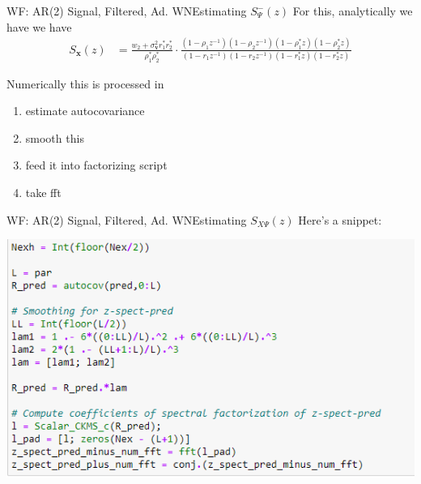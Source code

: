 \documentclass{beamer}  %
\begin{document}
\begin{frame}{WF: AR(2) Signal, Filtered, Ad. WN}{Estimating $S^-_{\Psi}(z)$}
	For this, analytically we have we have 
	\begin{align*}
	S_{\textbf{x}}(z) &=\frac{w_2 + \sigma_{\textbf{v}}^2r^*_1r^*_2}{\rho_1^*\rho_2^*}\cdot \frac{(1 - \rho_1z^{-1})(1 - \rho_2z^{-1})(1 - \rho_1^*z)(1 - \rho_2^*z)}{(1 - r_1z^{-1})(1 - r_2z^{-1})(1 - r_1^*z)(1 - r_2^*z)}
	\end{align*} 
	
	Numerically this is processed in 
	\begin{enumerate}
		\item estimate autocovariance
		\item smooth this
		\item feed it into factorizing script
		\item take fft
	\end{enumerate}
	
\end{frame}


\begin{frame}{WF: AR(2) Signal, Filtered, Ad. WN}{Estimating $S_{X\Psi}(z)$}
	Here's a snippet:
	
	
	\includegraphics[scale=.6]{fig/spectpred_code.PNG}
	
\end{frame}
\end{document}
